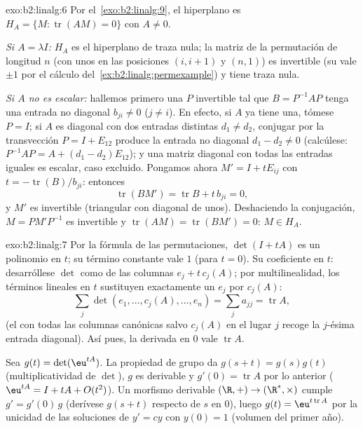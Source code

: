 \begin{solution}{exo:b2:linalg:6}
Por el~\cref{exo:b2:linalg:9}, el hiperplano es $H_A = \{M :
\operatorname{tr}(AM) = 0\}$ con $A \neq 0$.

\emph{Si $A = \lambda I$:} $H_A$ es el hiperplano de traza nula; la
matriz de la permutación  de longitud $n$ (con unos en las
posiciones $(i, i+1)$ y $(n, 1)$) es invertible (su  vale
$\pm 1$ por el cálculo del~\cref{ex:b2:linalg:permexample}) y tiene
traza nula.

\emph{Si $A$ no es escalar:} hallemos primero una $P$ invertible tal
que $B = P^{-1}AP$ tenga una entrada no diagonal $b_{ji} \neq 0$ ($j
\neq i$). En efecto, si $A$ ya tiene una, tómese $P = I$; si $A$ es
diagonal con dos entradas distintas $d_1 \neq d_2$, conjugar por la
transvección $P = I + E_{12}$ produce la entrada no diagonal $d_1 -
d_2 \neq 0$ (calcúlese: $P^{-1}AP = A + (d_1 - d_2)E_{12}$); y una
matriz diagonal con todas las entradas iguales es escalar, caso
excluido. Pongamos ahora $M' = I + tE_{ij}$ con $t =
-\operatorname{tr}(B)/b_{ji}$: entonces
\[
\operatorname{tr}(BM') = \operatorname{tr} B + t\,b_{ji} = 0,
\]
y $M'$ es invertible (triangular con diagonal de unos). Deshaciendo
la conjugación, $M = PM'P^{-1}$ es invertible y
$\operatorname{tr}(AM) = \operatorname{tr}(BM') = 0$: $M \in H_A$.
\end{solution}

\begin{solution}{exo:b2:linalg:7}
Por la fórmula de las permutaciones, $\det(I + tA)$ es un polinomio
en $t$; su término constante vale $1$ (para $t = 0$). Su coeficiente
en $t$: desarróllese $\det$ como  de las columnas
$e_j + t\,c_j(A)$; por multilinealidad, los términos lineales en $t$
sustituyen exactamente un $e_j$ por $c_j(A)$:
\[
\sum_{j} \det(e_1, \dots, c_j(A), \dots, e_n)
= \sum_j a_{jj} = \operatorname{tr} A ,
\]
(el  con todas las columnas canónicas salvo $c_j(A)$ en
el lugar $j$ recoge la $j$-ésima entrada diagonal). Así pues, la
derivada en $0$ vale $\operatorname{tr} A$.

Sea $g(t) = \det(\eu^{tA})$. La propiedad de grupo da $g(s + t) =
g(s)g(t)$ (multiplicatividad de $\det$), $g$ es derivable y $g'(0) =
\operatorname{tr} A$ por lo anterior ($\eu^{tA} = I + tA + O(t^2)$).
Un morfismo derivable $(\R, +) \to (\R^*, \times)$ cumple $g' =
g'(0)\,g$ (derívese $g(s+t)$ respecto de $s$ en $0$), luego $g(t) =
\eu^{t\operatorname{tr} A}$ por la unicidad de las soluciones de $y'
= cy$ con $y(0) = 1$ (volumen del primer año).
\end{solution}

